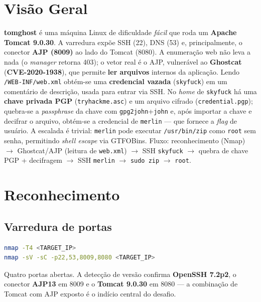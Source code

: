 \documentclass[12pt,a4paper]{article}
\begin{document}
\section{Visão Geral}
\textbf{tomghost} é uma máquina Linux de dificuldade \emph{fácil} que roda um
\textbf{Apache Tomcat 9.0.30}. A varredura expõe SSH (22), DNS (53) e,
principalmente, o conector \textbf{AJP (8009)} ao lado do Tomcat (8080). A
enumeração web não leva a nada (o \emph{manager} retorna 403); o vetor real é o
AJP, vulnerável ao \textbf{Ghostcat} (\textbf{CVE-2020-1938}), que permite
\textbf{ler arquivos} internos da aplicação. Lendo \texttt{/WEB-INF/web.xml}
obtém-se uma \textbf{credencial vazada} (\texttt{skyfuck}) em um comentário de
descrição, usada para entrar via SSH. No \emph{home} de \texttt{skyfuck} há uma
\textbf{chave privada PGP} (\texttt{tryhackme.asc}) e um arquivo cifrado
(\texttt{credential.pgp}); quebra-se a \emph{passphrase} da chave com
\texttt{gpg2john}+\texttt{john} e, após importar a chave e decifrar o arquivo,
obtém-se a credencial de \texttt{merlin} --- que fornece a \emph{flag} de usuário.
A escalada é trivial: \texttt{merlin} pode executar \texttt{/usr/bin/zip} como
\texttt{root} sem senha, permitindo \emph{shell escape} via GTFOBins. Fluxo:
reconhecimento (Nmap) $\rightarrow$ Ghostcat/AJP (leitura de \texttt{web.xml})
$\rightarrow$ SSH \texttt{skyfuck} $\rightarrow$ quebra de chave PGP + decifragem
$\rightarrow$ SSH \texttt{merlin} $\rightarrow$ \texttt{sudo zip} $\rightarrow$
\texttt{root}.

\section{Reconhecimento}

\subsection{Varredura de portas}
\begin{lstlisting}[language=bash,caption={Varredura inicial e detecção de versão com Nmap.}]
nmap -T4 <TARGET_IP>
nmap -sV -sC -p22,53,8009,8080 <TARGET_IP>
\end{lstlisting}

Quatro portas abertas. A detecção de versão confirma \textbf{OpenSSH 7.2p2}, o
conector \textbf{AJP13} em 8009 e o \textbf{Tomcat 9.0.30} em 8080 --- a
combinação de Tomcat com AJP exposto é o indício central do desafio.
\end{document}
